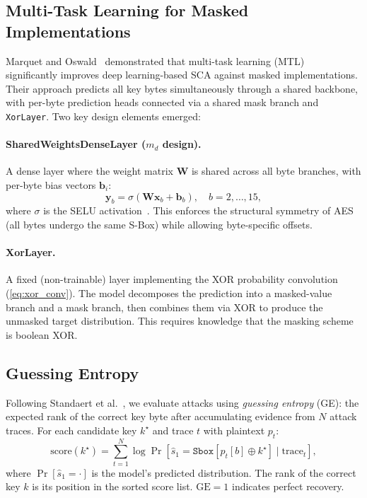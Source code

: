 \documentclass[submission]{iacrtrans}
\newcommand{\GE}{\mathrm{GE}}
\newcommand{\Sbox}{\mathtt{Sbox}}
\begin{document}
\subsection{Multi-Task Learning for Masked Implementations}\label{sec:bg_mtl}

Marquet and Oswald~\cite{marquet2024exploring} demonstrated that multi-task learning (MTL)~\cite{caruana1997multitask, ruder2017overview} significantly improves deep learning-based SCA against masked implementations. Their approach predicts all key bytes simultaneously through a shared backbone, with per-byte prediction heads connected via a shared mask branch and \texttt{XorLayer}. Two key design elements emerged:

\paragraph{SharedWeightsDenseLayer ($m_d$ design).} A dense layer where the weight matrix $\bm{W}$ is shared across all byte branches, with per-byte bias vectors $\bm{b}_i$:
\begin{equation}
  \bm{y}_b = \sigma(\bm{W} \bm{x}_b + \bm{b}_b), \quad b = 2, \ldots, 15,
\end{equation}
where $\sigma$ is the SELU activation~\cite{klambauer2017self}. This enforces the structural symmetry of AES (all bytes undergo the same S-Box) while allowing byte-specific offsets.

\paragraph{XorLayer.} A fixed (non-trainable) layer implementing the XOR probability convolution (\cref{eq:xor_conv}). The model decomposes the prediction into a masked-value branch and a mask branch, then combines them via XOR to produce the unmasked target distribution. This requires knowledge that the masking scheme is boolean XOR.

\subsection{Guessing Entropy}\label{sec:bg_ge}

Following Standaert et al.~\cite{standaert2009unified}, we evaluate attacks using \emph{guessing entropy} (GE): the expected rank of the correct key byte after accumulating evidence from $N$ attack traces. For each candidate key $k^\star$ and trace $t$ with plaintext $p_t$:
\begin{equation}\label{eq:ge}
  \text{score}(k^\star) = \sum_{t=1}^{N} \log \Pr[\hat{s}_1 = \Sbox[p_t[b] \oplus k^\star] \mid \text{trace}_t],
\end{equation}
where $\Pr[\hat{s}_1 = \cdot]$ is the model's predicted distribution. The rank of the correct key $k$ is its position in the sorted score list. $\GE = 1$ indicates perfect recovery.
\end{document}
